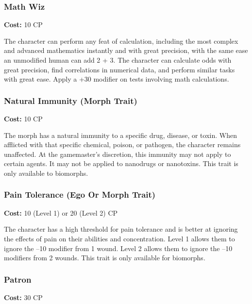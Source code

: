 \subsubsection{Math Wiz}

\textbf{Cost:} 10 CP

The character can perform any feat of calculation, 
including the most complex and advanced mathematics
instantly and with great precision, with the
same ease an unmodified human can add 2 + 3. The 
character can calculate odds with great precision, find 
correlations in numerical data, and perform similar 
tasks with great ease. Apply a +30 modifier on tests 
involving math calculations.

\subsubsection{Natural Immunity (Morph Trait)}

\textbf{Cost:} 10 CP

The morph has a natural immunity to a specific 
drug, disease, or toxin. When afflicted with that specific
chemical, poison, or pathogen, the character remains
unaffected. At the gamemaster's discretion, this
immunity may not apply to certain agents. It may not 
be applied to nanodrugs or nanotoxins. This trait is 
only available to biomorphs.

\subsubsection{Pain Tolerance (Ego Or Morph Trait)}

\textbf{Cost:} 10 (Level 1) or 20 (Level 2) CP

The character has a high threshold for pain tolerance
and is better at ignoring the effects of pain on
their abilities and concentration. Level 1 allows them 
to ignore the –10 modifier from 1 wound. Level 2
allows them to ignore the –10 modifiers from 2 
wounds. This trait is only available for biomorphs.

\subsubsection{Patron}

\textbf{Cost:} 30 CP

